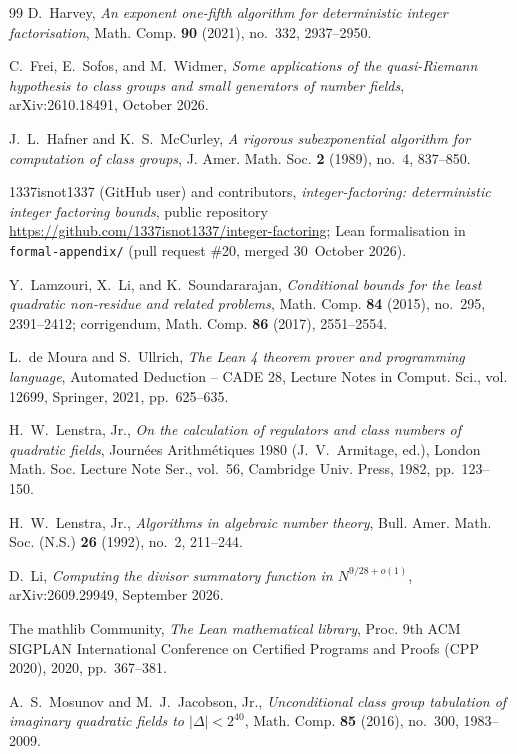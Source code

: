\documentclass[10pt]{amsart}
\theoremstyle{plain}
\theoremstyle{definition}
\theoremstyle{remark}
\numberwithin{equation}{section}
\begin{document}
\begin{thebibliography}{99}
D.~Harvey, \emph{An exponent one-fifth algorithm for deterministic integer factorisation}, Math. Comp.
\textbf{90} (2021), no.~332, 2937--2950.

C.~Frei, E.~Sofos, and M.~Widmer, \emph{Some applications of the quasi-{R}iemann hypothesis to class groups
and small generators of number fields}, arXiv:2610.18491, October 2026.

J.~L.~Hafner and K.~S.~McCurley, \emph{A rigorous subexponential algorithm for computation of class
groups}, J. Amer. Math. Soc. \textbf{2} (1989), no.~4, 837--850.

1337isnot1337 (GitHub user) and contributors, \emph{integer-factoring: deterministic integer factoring
bounds}, public repository \url{https://github.com/1337isnot1337/integer-factoring}; Lean formalisation in
\texttt{formal-appendix/} (pull request \#20, merged 30~October 2026).

Y.~Lamzouri, X.~Li, and K.~Soundararajan, \emph{Conditional bounds for the least quadratic non-residue and
related problems}, Math. Comp. \textbf{84} (2015), no.~295, 2391--2412; corrigendum, Math. Comp. \textbf{86}
(2017), 2551--2554.

L.~de Moura and S.~Ullrich, \emph{The {L}ean 4 theorem prover and programming language}, Automated
Deduction -- CADE 28, Lecture Notes in Comput. Sci., vol. 12699, Springer, 2021, pp.~625--635.

H.~W.~Lenstra, Jr., \emph{On the calculation of regulators and class numbers of quadratic fields},
Journ\'ees Arithm\'etiques 1980 (J.~V.~Armitage, ed.), London Math. Soc. Lecture Note Ser., vol.~56,
Cambridge Univ. Press, 1982, pp.~123--150.

H.~W.~Lenstra, Jr., \emph{Algorithms in algebraic number theory}, Bull. Amer. Math. Soc. (N.S.)
\textbf{26} (1992), no.~2, 211--244.

D.~Li, \emph{Computing the divisor summatory function in $N^{9/28+o(1)}$}, arXiv:2609.29949, September 2026.

The mathlib Community, \emph{The {L}ean mathematical library}, Proc. 9th ACM SIGPLAN International
Conference on Certified Programs and Proofs (CPP 2020), 2020, pp.~367--381.

A.~S.~Mosunov and M.~J.~Jacobson, Jr., \emph{Unconditional class group tabulation of imaginary quadratic
fields to $|\Delta|<2^{40}$}, Math. Comp. \textbf{85} (2016), no.~300, 1983--2009.


\end{thebibliography}
\end{document}
